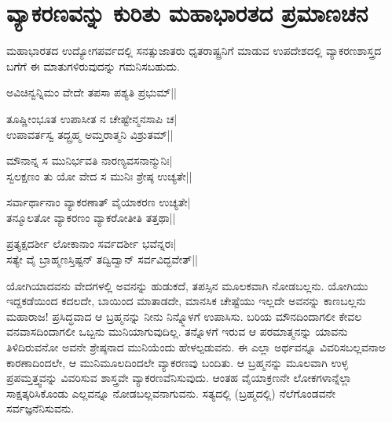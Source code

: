 \section*{ವ್ಯಾಕರಣವನ್ನು ಕುರಿತು ಮಹಾಭಾರತದ ಪ್ರಮಾಣಚನ}

ಮಹಾಭಾರತದ ಉದ್ಯೋಗಪರ್ವದಲ್ಲಿ ಸನತ್ಸುಜಾತರು ಧೃತರಾಷ್ಟ್ರನಿಗೆ ಮಾಡುವ ಉಪದೇಶದಲ್ಲಿ ವ್ಯಾಕರಣಶಾಸ್ತ್ರದ ಬಗೆಗೆ ಈ ಮಾತುಗಳಿರುವುದನ್ನು ಗಮನಿಸಬಹುದು.

\begin{shloka}
ಅವಿಚಿನ್ವನ್ನಿಮಂ ವೇದೇ ತಪಸಾ ಪಶ್ಯತಿ ಪ್ರಭುಮ್||
\end{shloka}

\begin{shloka}
ತೂಷ್ಣೀಂಭೂತ ಉಪಾಸೀತ ನ ಚೇಷ್ಟೇನ್ಮನಸಾಪಿ ಚ|\\
ಉಪಾವರ್ತಸ್ವ ತದ್ಬ್ರಹ್ಮ ಅಮ್ತರಾತ್ಮನಿ ವಿಶ್ರುತಮ್||
\end{shloka}

\begin{shloka}
ಮೌನಾನ್ನ ಸ ಮುನಿರ್ಭವತಿ ನಾರಣ್ಯವಸನಾನ್ಮುನಿಃ|\\
ಸ್ವಲಕ್ಷಣಂ ತು ಯೋ ವೇದ ಸ ಮುನಿಃ ಶ್ರೇಷ್ಠ ಉಚ್ಯತೇ||
\end{shloka}

\begin{shloka}
ಸರ್ವಾರ್ಥಾನಾಂ ವ್ಯಾಕರಣಾತ್ ವೈಯಾಕರಣ ಉಚ್ಯತೇ|\\
ತನ್ಮೂಲತೋ ವ್ಯಾಕರಣಂ ವ್ಯಾಕರೋತೀತಿ ತತ್ತಥಾ||
\end{shloka}

\begin{shloka}
ಪ್ರತ್ಯಕ್ಷದರ್ಶೀ ಲೋಕಾನಾಂ ಸರ್ವದರ್ಶೀ ಭವೆನ್ನರಃ|\\
ಸತ್ಯೇ ವೈ ಬ್ರಾಹ್ಮಣಸ್ತಿಷ್ಟನ್ ತದ್ವಿದ್ವಾನ್ ಸರ್ವವಿದ್ಭವೇತ್||
\end{shloka}

ಯೋಗಿಯಾದವನು ವೇದಗಳಲ್ಲಿ ಅವನನ್ನು ಹುಡುಕದೆ, ತಪಸ್ಸಿನ ಮೂಲಕವಾಗಿ ನೋಡಬಲ್ಲನು. ಯೋಗಿಯು ಇದ್ದಕಡೆಯಿಂದ ಕದಲದೇ, ಬಾಯಿಂದ ಮಾತಾಡದೇ, ಮಾನಸಿಕ ಚೇಷ್ಟೆಯು ಇಲ್ಲದೇ ಅವನನ್ನು ಕಾಣಬಲ್ಲನು ಮಹಾರಾಜ! ಪ್ರಸಿದ್ಧವಾದ ಆ ಬ್ರಹ್ಮನನ್ನು ನೀನು ನಿನ್ನ್ನೊಳಗೆ ಉಪಾಸಿಸು. ಬರಿಯ ಮೌನದಿಂದಾಗಲೀ ಕೇವಲ ವನವಾಸದಿಂದಾಗಲೀ ಒಬ್ಬನು ಮುನಿಯಾಗುವುದಿಲ್ಲ. ತನ್ನೊಳಗೆ ಇರುವ ಆ ಪರಮಾತ್ಮನನ್ನು ಯಾವನು ತಿಳಿದಿರುವನೋ ಅವನೇ ಶ್ರೇಷ್ಠನಾದ ಮುನಿಯೆಂದು ಹೇಳಲ್ಪಡುವನು. ಈ ಎಲ್ಲಾ ಅರ್ಥವನ್ನೂ ವಿವರಿಸಬಲ್ಲವನಾಅ ಕಾರಣಾದಿಂದಲೇ, ಆ ಮುನಿಮೂಲದಿಂದಲೇ ವ್ಯಾಕರಣವು ಬಂದಿತು. ಆ ಬ್ರಹ್ಮನನ್ನು ಮೂಲವಾಗಿ ಉಳ್ಳ ಪ್ರಪಮ್ತತ್ತ್ವವನ್ನು ವಿವರಿಸುವ ಶಾಸ್ತ್ರವೇ ವ್ಯಾಕರಣವೆನಿಸುವುದು. ಆಂತಹ ವೈಯಾಕ್ರಣನೇ ಲೋಕಗಳಾನ್ನೆಲ್ಲಾ ಸಾಕ್ಷತ್ಕರಿಸಿಕೊಂಡು ಎಲ್ಲವನ್ನೂ ನೋಡಬಲ್ಲವನಾಗುವನು. ಸತ್ಯದಲ್ಲಿ (ಬ್ರಹ್ಮದಲ್ಲಿ) ನೆಲೆಗೊಂಡವನೇ ಸರ್ವಜ್ಞನೆನಿಸುವನು.

